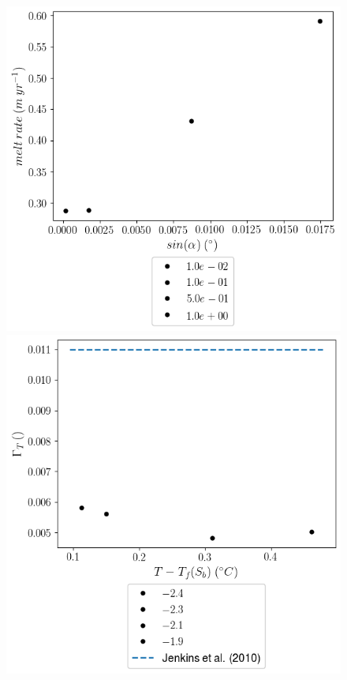 \documentclass[draft]{agujournal2019}
\begin{document}
\begin{figure}[h!]
\begin{minipage}{0.5\textwidth}
        \includegraphics[trim={0 3.5cm 0 0},clip,width=\textwidth]{Figures/melt_dslope_tav12.png}
    \end{minipage}
    \begin{minipage}{0.5\textwidth}
        \includegraphics[trim={0 4.1cm 0 0cm},clip,width=\textwidth]{Figures/gammaT_dT_tav12_zlim2.png}

\end{minipage}
\end{figure}
\end{document}

